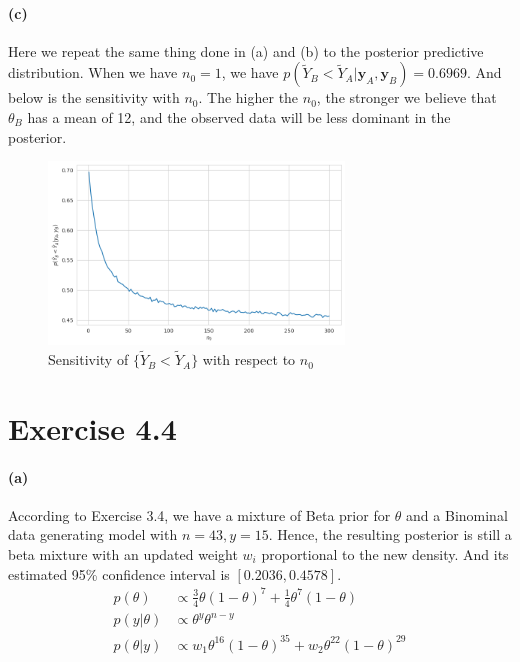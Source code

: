 \documentclass[11pt, letterpaper]{article}
\begin{document}
\paragraph{(c)}
Here we repeat the same thing done in (a) and (b) to the posterior predictive distribution. When we have $n_0=1$, we have $p(\tilde{Y}_B < \tilde{Y}_A|\mathbf{y}_A, \mathbf{y}_B) = 0.6969$. And below is the sensitivity with $n_0$. The higher the $n_0$, the stronger we believe that $\theta_B$ has a mean of 12, and the observed data will be less dominant in the posterior.

\begin{figure}[!h]
  \centering
  \includegraphics[width=0.7\textwidth]{4.2.c.png}
  \captionsetup{justification=centering}
  \caption{Sensitivity of $\{\tilde{Y}_B < \tilde{Y}_A\}$ with respect to $n_0$}
\end{figure}

\section{Exercise 4.4}
\paragraph{(a)}
According to Exercise 3.4, we have a mixture of Beta prior for $\theta$ and a Binominal data generating model with $n=43, y=15$. Hence, the resulting posterior is still a beta mixture with an updated weight $w_i$ proportional to the new density. And its estimated 95\% confidence interval is $[0.2036, 0.4578]$.
\begin{align*}
    p(\theta) &\propto \frac{3}{4} \theta (1-\theta)^7 + \frac{1}{4} \theta^7(1-\theta) \\
    p(y|\theta) &\propto \theta^y \theta^{n-y} \\
    p(\theta|y) &\propto w_1 \theta^{16} (1-\theta)^{35} + w_2 \theta^{22}(1-\theta)^{29}
\end{align*}
\end{document}
